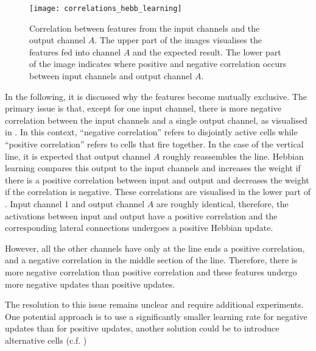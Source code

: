 \begin{figure}[h]
    \centering
    \texttt{[image: correlations\_hebb\_learning]}
    \caption[Feature correlations]{Correlation between features from the input channels and the output channel $A$. The upper part of the images visualises the features fed into channel $A$ and the expected result. The lower part of the image indicates where positive and negative correlation occurs between input channels and output channel $A$.}
\end{figure}
%
In the following, it is discussed why the features become mutually exclusive.
The primary issue is that, except for one input channel, there is more negative correlation between the input channels and a single output channel, as visualised in .
In this context, ``negative correlation'' refers to disjointly active cells while ``positive correlation'' refers to cells that fire together.
In the case of the vertical line, it is expected that output channel $A$ roughly reassembles the line.
Hebbian learning compares this output to the input channels and increases the weight if there is a positive correlation between input and output and decreases the weight if the correlation is negative.
These correlations are visualised in the lower part of .
Input channel $1$ and output channel $A$ are roughly identical, therefore, the activations between input and output have a positive correlation and the corresponding lateral connections undergoes a positive Hebbian update.

However, all the other channels have only at the line ends a positive correlation, and a negative correlation in the middle section of the line.
Therefore, there is more negative correlation than positive correlation and these features undergo more negative updates than positive updates.

The resolution to this issue remains unclear and require additional experiments. One potential approach is to use a significantly smaller learning rate for negative updates than for positive updates, another solution could be to introduce alternative cells (c.f. )

